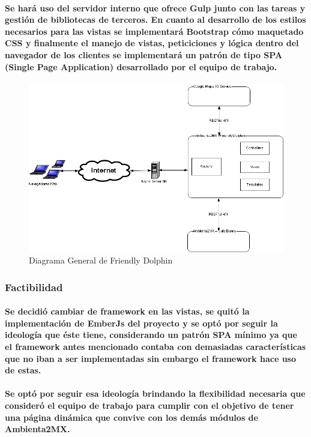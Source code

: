     \paragraph{Se hará uso del servidor interno que ofrece Gulp junto con las tareas y gestión de bibliotecas de terceros. En cuanto al desarrollo de los estilos necesarios para las vistas se implementará Bootstrap cómo maquetado CSS y finalmente el manejo de vistas, peticiciones y lógica dentro del navegador de los clientes se implementará un patrón de tipo SPA (Single Page Application)\cite{36} desarrollado por el equipo de trabajo.}
    \begin{figure}[b!]
      \centering
        \includegraphics[width=\textwidth]{./images/DiagramaFriendlyDolphin.png}
      \caption{Diagrama General de Friendly Dolphin}
    \end{figure}
  \subsubsection{Factibilidad}   
    \paragraph{Se decidió cambiar de framework en las vistas, se quitó la implementación de EmberJs del proyecto y se optó por seguir la ideología que éste tiene, considerando un patrón SPA mínimo ya que el framework antes mencionado contaba con demasiadas características que no iban a ser implementadas sin embargo el framework hace uso de estas.}
    \paragraph{Se optó por seguir esa ideología brindando la flexibilidad necesaria que consideró el equipo de trabajo para cumplir con el objetivo de tener una página dinámica que convive con los demás módulos de Ambienta2MX.}
